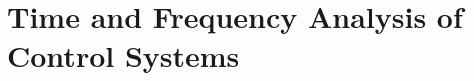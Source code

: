 \documentclass[../course]{subfiles}
\begin{document}
\chapter{Time and Frequency Analysis of Control Systems} \label{chp:ch02TimeFreqAnalysis}


\end{document}
